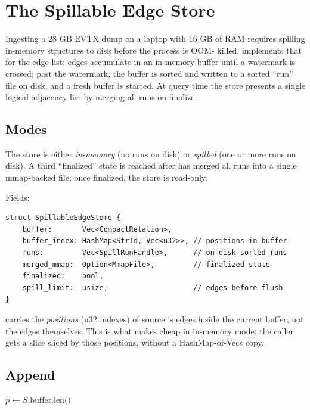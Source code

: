 \chapter{The Spillable Edge Store}
\label{ch:spill}

Ingesting a 28 GB EVTX dump on a laptop with 16 GB of RAM requires
spilling in-memory structures to disk before the process is OOM-
killed.  implements that for the edge
list: edges accumulate in an in-memory buffer until a watermark is
crossed; past the watermark, the buffer is sorted and written to a
sorted ``run'' file on disk, and a fresh buffer is started. At
query time the store presents a single logical adjacency list by
merging all runs on finalize.

\section{Modes}

\begin{definition}
The store is either \emph{in-memory} (no runs on disk) or
\emph{spilled} (one or more runs on disk). A third ``finalized''
state is reached after  has merged all runs into a
single mmap-backed file; once finalized, the store is read-only.
\end{definition}

Fields:

\begin{lstlisting}[style=rust]
struct SpillableEdgeStore {
    buffer:       Vec<CompactRelation>,
    buffer_index: HashMap<StrId, Vec<u32>>, // positions in buffer
    runs:         Vec<SpillRunHandle>,      // on-disk sorted runs
    merged_mmap:  Option<MmapFile>,         // finalized state
    finalized:    bool,
    spill_limit:  usize,                    // edges before flush
}
\end{lstlisting}

 carries the \emph{positions} (u32 indexes)
of source 's edges inside the current buffer, not the edges
themselves. This is what makes  cheap in
in-memory mode: the caller gets a slice sliced by those positions,
without a HashMap-of-Vecs copy.

\section{Append}

\begin{algorithm}
\caption{\textsc{Spill-Append}}\label{alg:spill-append}
$p \gets S.\text{buffer.len()}$\;
\;
\;
\end{algorithm}


